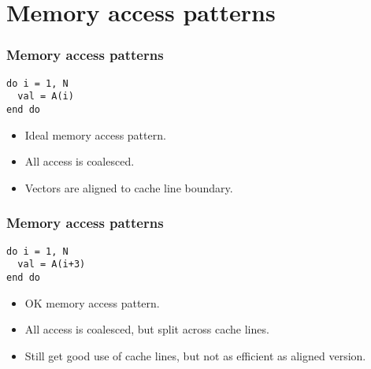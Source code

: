 \documentclass[aspectratio=169]{beamer}
\begin{document}
\section{Memory access patterns}
\begin{frame}[fragile]
\frametitle{Memory access patterns}
\begin{verbatim}
do i = 1, N
  val = A(i)
end do
\end{verbatim}
\begin{adjustbox}{max width={\textwidth}}
\end{adjustbox}
\begin{itemize}
  \item Ideal memory access pattern.
  \item All access is coalesced.
  \item Vectors are aligned to cache line boundary.
\end{itemize}
\end{frame}

\begin{frame}[fragile]
\frametitle{Memory access patterns}
\begin{verbatim}
do i = 1, N
  val = A(i+3)
end do
\end{verbatim}
\begin{adjustbox}{max width={\textwidth}}
\end{adjustbox}
\begin{itemize}
  \item OK memory access pattern.
  \item All access is coalesced, but split across cache lines.
  \item Still get good use of cache lines, but not as efficient as aligned version.
\end{itemize}
\end{frame}
\end{document}
